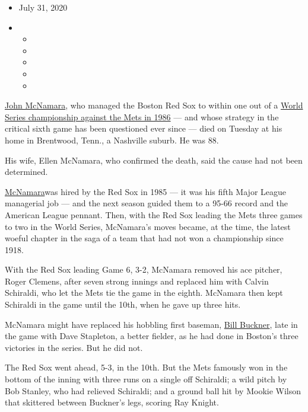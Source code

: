 \begin{itemize}
\item
  July 31, 2020
\item
  \begin{itemize}
  \item
  \item
  \item
  \item
  \item
  \end{itemize}
\end{itemize}

\href{https://www.baseball-reference.com/managers/mcnamjo99.shtml}{John
McNamara}, who managed the Boston Red Sox to within one out of a
\href{https://www.baseball-reference.com/postseason/1986_WS.shtml}{World
Series championship against the Mets in 1986} --- and whose strategy in
the critical sixth game has been questioned ever since --- died on
Tuesday at his home in Brentwood, Tenn., a Nashville suburb. He was 88.

His wife, Ellen McNamara, who confirmed the death, said the cause had
not been determined.

\href{https://sabr.org/bioproj/person/john-mcnamara/}{McNamara}was hired
by the Red Sox in 1985 --- it was his fifth Major League managerial job
--- and the next season guided them to a 95-66 record and the American
League pennant. Then, with the Red Sox leading the Mets three games to
two in the World Series, McNamara's moves became, at the time, the
latest woeful chapter in the saga of a team that had not won a
championship since 1918.

With the Red Sox leading Game 6, 3-2, McNamara removed his ace pitcher,
Roger Clemens, after seven strong innings and replaced him with Calvin
Schiraldi, who let the Mets tie the game in the eighth. McNamara then
kept Schiraldi in the game until the 10th, when he gave up three hits.

McNamara might have replaced his hobbling first baseman,
\href{https://www.nytimes.com/2019/05/27/obituaries/bill-buckner-all-star-shadowed-by-world-series-error-dies-at-69.html}{Bill
Buckner}, late in the game with Dave Stapleton, a better fielder, as he
had done in Boston's three victories in the series. But he did not.

The Red Sox went ahead, 5-3, in the 10th. But the Mets famously won in
the bottom of the inning with three runs on a single off Schiraldi; a
wild pitch by Bob Stanley, who had relieved Schiraldi; and a ground ball
hit by Mookie Wilson that skittered between Buckner's legs, scoring Ray
Knight.

